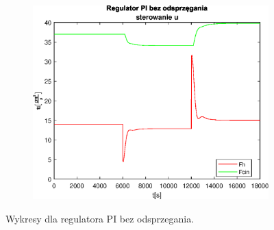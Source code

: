 \begin{figure}[h!]
   \begin{subfigure}[b]{0.4\textwidth}
      \includegraphics[width=1\linewidth]{img/PI/noDecoupler/noDisturbance/PINoDecouplerControl2Linfalse.eps}
      \caption{}
      \label{fig:fig:PINodDecoupler2Linfalse3}
   \end{subfigure}
       
   \caption{Wykresy dla regulatora PI bez odsprzegania.}
   \label{fig:PINodDecoupler2Linfalse}
\end{figure}
           
